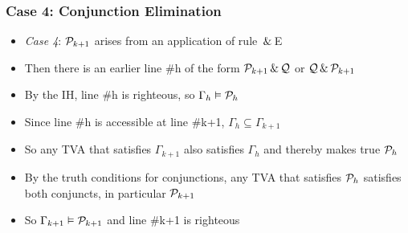 \begin{frame}
\frametitle{Case 4: Conjunction Elimination}

\begin{itemize}[<+->]

\item \emph{Case 4}: $\mathcal{P}_{k +1}$ arises from an application of rule $\,\&\,${}E


\item Then there is an earlier line \#h of the form $\mathcal{P}_{k +1} \,\&\, \mathcal{Q} $ or $\mathcal{Q} \,\&\, \mathcal{P}_{k +1}$

\item By the IH, line \#h is righteous, so $\Gamma_{h} \vDash \mathcal{P}_{h}$

\item Since line \#h is accessible at line \#k+1, $\Gamma_{h} \subseteq \Gamma_{k+1}$

\item So any TVA that satisfies $\Gamma_{k+1}$ also satisfies $\Gamma_{h}$ and thereby makes true $\mathcal{P}_{h}$

\item By the truth conditions for conjunctions, any TVA that satisfies $\mathcal{P}_{h}$ satisfies both conjuncts, in particular $\mathcal{P}_{k +1}$

\item So $\Gamma_{k+1} \vDash \mathcal{P}_{k+1}$ and line \#k+1 is righteous

\end{itemize}
\end{frame}


